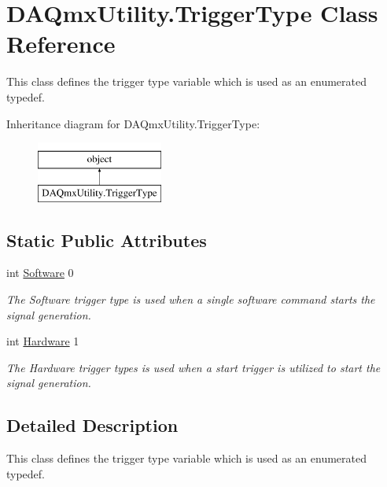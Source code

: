\hypertarget{class_d_a_qmx_utility_1_1_trigger_type}{\section{D\-A\-Qmx\-Utility.\-Trigger\-Type Class Reference}
\label{class_d_a_qmx_utility_1_1_trigger_type}
}


This class defines the trigger type variable which is used as an enumerated typedef.  


Inheritance diagram for D\-A\-Qmx\-Utility.\-Trigger\-Type\-:\begin{figure}[H]
\begin{center}
\leavevmode
\includegraphics[height=2.000000cm]{class_d_a_qmx_utility_1_1_trigger_type}
\end{center}
\end{figure}
\subsection*{Static Public Attributes}
\begin{DoxyCompactItemize}
\item 
int \hyperlink{class_d_a_qmx_utility_1_1_trigger_type_a7427a18d64562c6221627ae8fc80da93}{Software} 0
\begin{DoxyCompactList}\small\item\em The Software trigger type is used when a single software command starts the signal generation. \end{DoxyCompactList}\item 
int \hyperlink{class_d_a_qmx_utility_1_1_trigger_type_a52598eae33e8cc6021f037a0c79e8500}{Hardware} 1
\begin{DoxyCompactList}\small\item\em The Hardware trigger types is used when a start trigger is utilized to start the signal generation. \end{DoxyCompactList}\end{DoxyCompactItemize}


\subsection{Detailed Description}
This class defines the trigger type variable which is used as an enumerated typedef. 



